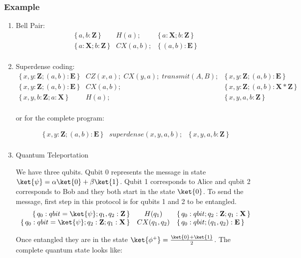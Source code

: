 \documentclass[acmsmall,nonacm,review,timestamp]{acmart}
\newcommand{\Z}{\ensuremath{\mathbf{Z}}\xspace}
\newcommand{\X}{\ensuremath{\mathbf{X}}\xspace}
\newcommand{\E}{\ensuremath{\mathbf{E}}\xspace}
\newcommand\hoare[3]{\{\,#1\,\}&#2&\{\,#3\,\}}
\begin{document}
\subsubsection{Example}
\begin{enumerate}
	\item Bell Pair:
\[ \begin{array}{rcl}
\hoare{a, b : \Z}{H(a);}{a : \X; b: \Z} \\
\hoare{a : \X; b: \Z}{CX(a, b);}{(a, b): \E} \\
\end{array} \]

	\item Superdense coding:
\[ \begin{array}{rcl}
\hoare{x, y : \Z; (a, b): \E}{CZ(x,a); \; CX(y, a); \; transmit(A, B);}{x, y : \Z; (a, b): \E} \\
\hoare{x, y : \Z; (a, b): \E}{CX(a, b);}{x, y : \Z; (a, b): \X \ast \Z} \\
\hoare{x, y, b : \Z; a: \X}{H(a);}{x, y, a, b : \Z} \\
\end{array} \]

or for the complete program:

\[ \begin{array}{rcl}
\hoare{x, y : \Z; (a, b): \E}{ superdense(x, y, a, b);}{x, y, a, b : \Z} \\
\end{array} \]


\newpage

	\item Quantum Teleportation

	We have three qubits. Qubit 0 represents the message in state $\ket{\psi} = \alpha \ket{0} + \beta \ket{1}$. Qubit 1 corresponds to Alice and qubit 2 corresponds to Bob and they both start in the state $\ket{0}$. To send the message, first step in this protocol is for qubits 1 and 2 to be entangled.
\[ \begin{array}{rcl}
\hoare{q_0: qbit = \ket{\psi}; q_1, q_2 : \Z}{H(q_1)}{q_0: qbit; q_2 : \Z; q_1 : \X} \\
\hoare{q_0: qbit = \ket{\psi}; q_2 : \Z; q_1 : \X}{CX(q_1, q_2)}{q_0: qbit; (q_1,q_2) : \E} \\
\end{array} \]

Once entangled they are in the state $\ket{\phi^+} = \frac{\ket{0} + \ket{1}}{2}$. The complete quantum state looks like:


\end{enumerate}
\end{document}
